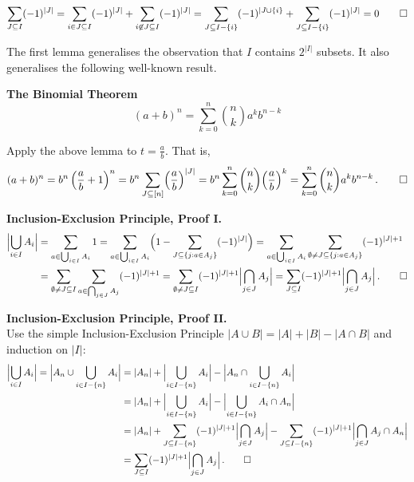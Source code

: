 \documentclass[a4paper]{article}
\let\oldendproof\endproof
\renewenvironment{proof}[1][\proofname]{%
  \oldproof[\scshape \noindent {\bfseries \text{Proof}}]%
}{\oldendproof}
\newenvironment{thm}[1]{
	\begin{framed}
	\noindent
	{\bfseries #1}\\}{\setlength{\itemsep}{0pt}
	\end{framed}
}
\newcommand{\abs}[1]{\Bigl| #1 \Bigr|}
\begin{document}
\begin{proof}
\[
    \sum_{J \subseteq I} (-1)^{|J|}
  = \sum_{i \in J \subseteq I} (-1)^{|J|} + \sum_{i\not\in J \subseteq I} (-1)^{|J|}
  = \sum_{J \subseteq I - \{i\}} (-1)^{|J \cup \{i\}} + \sum_{J \subseteq I - \{i\}}
  (-1)^{|J|} = 0\qedhere
\]
\end{proof}
	
The first lemma generalises the observation that $I$ contains $2^{|I|}$ subsets.
It also generalises the following well-known result.

\begin{thm}{The Binomial Theorem}
	\[ (a+b)^n = \sum_{k=0}^n \binom{n}{k} a^k b^{n-k}\]
\end{thm}

\begin{proof}
Apply the above lemma to $t = \frac{a}{b}$. That is,
\[
    (a+b)^n
  = b^n \left(\frac{a}{b} + 1\right)^n
  = b^n \sum_{J \subseteq [n]} \Bigl(\frac{a}{b}\Bigr)^{|J|}
  = b^n \sum_{k=0}^n \binom{n}{k} \Bigl(\frac{a}{b}\Bigr)^k
  = \sum_{k=0}^n \binom{n}{k} a^k b^{n-k}\,.\qedhere
\]
\end{proof}

\medskip
\noindent
{\bfseries Inclusion-Exclusion Principle, Proof I.}
\begin{align*}
	  \Bigl| \bigcup_{i \in I} A_i \Bigr|
  & = \sum_{a \in \bigcup_{i \in I} A_i} 1
    = \sum_{a \in \bigcup_{i \in I} A_i} \Bigl(1 - \sum_{J \subseteq \{ j : a \in A_j\}}
    (-1)^{|J|}\Bigr)
    = \sum_{a \in \bigcup_{i \in I} A_i} \sum_{\emptyset \neq J \subseteq \{ j : a \in
    A_j\}} (-1)^{|J| +1}\\
  & = \sum_{\emptyset \neq J \subseteq I} \sum_{a \in \bigcap_{j \in J} A_j} (-1)^{|J|+1}
    = \sum_{\emptyset \neq J \subseteq I} (-1)^{|J| +1} \Bigl| \bigcap_{j \in J}A_j\Bigr|
    = \sum_{J \subseteq I} (-1)^{|J|+1} \Bigl| \bigcap_{j \in J} A_j \Bigr|\,.\qed
\end{align*}

\medskip
\noindent
{\bfseries Inclusion-Exclusion Principle, Proof II.}\\
Use the simple Inclusion-Exclusion Principle $|A \cup B| = |A| + |B| - |A \cap B|$ and
induction on $|I|$:
\begin{align*}
	    \Bigl| \bigcup_{i \in I} A_i \Bigr|
      = \abs{A_n \cup \bigcup_{i \in I-\{n\}} A_i}
	& = |A_n| + \abs{\bigcup_{i \in I - \{n\}} A_i} - \abs{A_n \cap \bigcup_{i \in I
-\{n\}} A_i}\\
	& = |A_n| + \abs{\bigcup_{i \in I-\{n\}} A_i} - \abs{\bigcup_{i \in I - \{n\}} A_i\cap
A_n}\\
	& = |A_n| + \sum_{J \subseteq I - \{n\}} (-1)^{|J|+1} \abs{\bigcap_{j \in J} A_j}
-\sum_{J \subseteq I - \{n\}} (-1)^{|J|+1} \abs{\bigcap_{j \in J} A_j \cap A_n}\\
	& = \sum_{J \subseteq I} (-1)^{|J|+1} \abs{\bigcap_{j \in J} A_j}\,.\qed
\end{align*}
\end{document}
